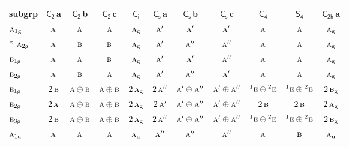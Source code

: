 \documentclass[10pt,a4paper]{article}
\numberwithin{equation}{section}
\newcommand{\grp}[1]{\mathsf{#1}}
\newcommand{\irr}[1]{\text{\normalfont\scshape #1}}
\newcommand{\conjpair}[1]{{}^{#1}}
\newcommand{\ptag}[1]{\mathrm{#1}}
\newcommand{\clsletter}[1]{\,{\scriptsize\color{black!55}#1}}
\begin{document}
{\small\begin{longtable}{@{}lcccccccccc@{}}\toprule
subgrp & \href{C2.pdf}{$\grp{C_{2}}$}\clsletter{a} & \href{C2.pdf}{$\grp{C_{2}}$}\clsletter{b} & \href{C2.pdf}{$\grp{C_{2}}$}\clsletter{c} & \href{S2.pdf}{$\grp{C_{i}}$} & \href{C1v.pdf}{$\grp{C_{s}}$}\clsletter{a} & \href{C1v.pdf}{$\grp{C_{s}}$}\clsletter{b} & \href{C1v.pdf}{$\grp{C_{s}}$}\clsletter{c} & \href{C4.pdf}{$\grp{C_{4}}$} & \href{S4.pdf}{$\grp{S_{4}}$} & \href{C2h.pdf}{$\grp{C_{2h}}$}\clsletter{a}\\\midrule\endhead
\bottomrule\endfoot\endlastfoot
$\irr{a}_{1\ptag{g}}$ & $\irr{a}$ & $\irr{a}$ & $\irr{a}$ & $\irr{a}_{\ptag{g}}$ & $\irr{a}'$ & $\irr{a}'$ & $\irr{a}'$ & $\irr{a}$ & $\irr{a}$ & $\irr{a}_{\ptag{g}}$\\*
$\irr{a}_{2\ptag{g}}$ & $\irr{a}$ & $\irr{b}$ & $\irr{b}$ & $\irr{a}_{\ptag{g}}$ & $\irr{a}'$ & $\irr{a}''$ & $\irr{a}''$ & $\irr{a}$ & $\irr{a}$ & $\irr{a}_{\ptag{g}}$\\
$\irr{b}_{1\ptag{g}}$ & $\irr{a}$ & $\irr{a}$ & $\irr{b}$ & $\irr{a}_{\ptag{g}}$ & $\irr{a}'$ & $\irr{a}'$ & $\irr{a}''$ & $\irr{a}$ & $\irr{a}$ & $\irr{a}_{\ptag{g}}$\\
$\irr{b}_{2\ptag{g}}$ & $\irr{a}$ & $\irr{b}$ & $\irr{a}$ & $\irr{a}_{\ptag{g}}$ & $\irr{a}'$ & $\irr{a}''$ & $\irr{a}'$ & $\irr{a}$ & $\irr{a}$ & $\irr{a}_{\ptag{g}}$\\
$\irr{e}_{1\ptag{g}}$ & $2\,\irr{b}$ & $\irr{a}\oplus \irr{b}$ & $\irr{a}\oplus \irr{b}$ & $2\,\irr{a}_{\ptag{g}}$ & $2\,\irr{a}''$ & $\irr{a}'\oplus \irr{a}''$ & $\irr{a}'\oplus \irr{a}''$ & $\conjpair{1}\irr{e}\oplus \conjpair{2}\irr{e}$ & $\conjpair{1}\irr{e}\oplus \conjpair{2}\irr{e}$ & $2\,\irr{b}_{\ptag{g}}$\\
$\irr{e}_{2\ptag{g}}$ & $2\,\irr{a}$ & $\irr{a}\oplus \irr{b}$ & $\irr{a}\oplus \irr{b}$ & $2\,\irr{a}_{\ptag{g}}$ & $2\,\irr{a}'$ & $\irr{a}'\oplus \irr{a}''$ & $\irr{a}'\oplus \irr{a}''$ & $2\,\irr{b}$ & $2\,\irr{b}$ & $2\,\irr{a}_{\ptag{g}}$\\
$\irr{e}_{3\ptag{g}}$ & $2\,\irr{b}$ & $\irr{a}\oplus \irr{b}$ & $\irr{a}\oplus \irr{b}$ & $2\,\irr{a}_{\ptag{g}}$ & $2\,\irr{a}''$ & $\irr{a}'\oplus \irr{a}''$ & $\irr{a}'\oplus \irr{a}''$ & $\conjpair{1}\irr{e}\oplus \conjpair{2}\irr{e}$ & $\conjpair{1}\irr{e}\oplus \conjpair{2}\irr{e}$ & $2\,\irr{b}_{\ptag{g}}$\\
$\irr{a}_{1\ptag{u}}$ & $\irr{a}$ & $\irr{a}$ & $\irr{a}$ & $\irr{a}_{\ptag{u}}$ & $\irr{a}''$ & $\irr{a}''$ & $\irr{a}''$ & $\irr{a}$ & $\irr{b}$ & $\irr{a}_{\ptag{u}}$\\

\end{longtable}}
\end{document}

